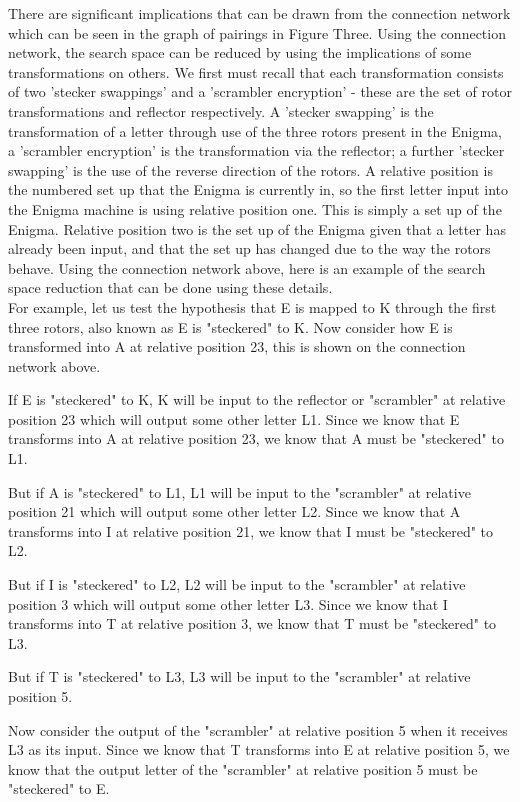 \documentclass[12pt,a4paper]{article}
\begin{document}
There are significant implications that can be drawn from the connection network which can be seen in the graph of pairings in Figure Three. Using the connection network, the search space can be reduced by using the implications of some transformations on others. We first must recall that each transformation consists of two 'stecker swappings' and a 'scrambler encryption' - these are the set of rotor transformations and reflector respectively. A 'stecker swapping' is the transformation of a letter through use of the three rotors present in the Enigma, a 'scrambler encryption' is the transformation via the reflector; a further 'stecker swapping' is the use of the reverse direction of the rotors. A relative position is the numbered set up that the Enigma is currently in, so the first letter input into the Enigma machine is using relative position one. This is simply a set up of the Enigma. Relative position two is the set up of the Enigma given that a letter has already been input, and that the set up has changed due to the way the rotors behave. Using the connection network above, here is an example of the search space reduction that can be done using these details.\\

For example, let us test the hypothesis that E is mapped to K through the first three rotors, also known as E is "steckered" to K. Now consider how E is transformed into A at relative position 23, this is shown on the connection network above.

If E is "steckered" to K, K will be input to the reflector or "scrambler" at relative position 23 which will output some other letter L1. Since we know that E transforms into A at relative position 23, we know that A must be "steckered" to L1.

But if A is "steckered" to L1, L1 will be input to the "scrambler" at relative position 21 which will output some other letter L2. Since we know that A transforms into I at relative position 21, we know that I must be "steckered" to L2.

But if I is "steckered" to L2, L2 will be input to the "scrambler" at relative position 3 which will output some other letter L3. Since we know that I transforms into T at relative position 3, we know that T must be "steckered" to L3.

But if T is "steckered" to L3, L3 will be input to the "scrambler" at relative position 5.

Now consider the output of the "scrambler" at relative position 5 when it receives L3 as its input. Since we know that T transforms into E at relative position 5, we know that the output letter of the "scrambler" at relative position 5 must be "steckered" to E.
\end{document}
